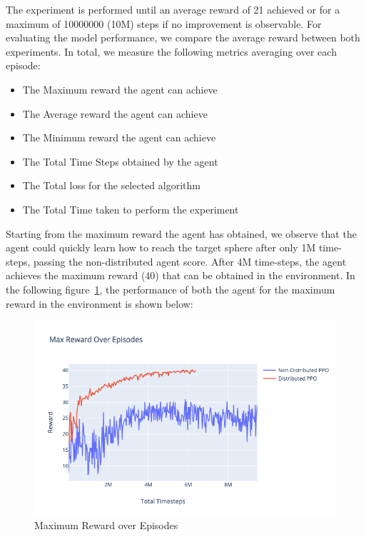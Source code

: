 The experiment is performed until an average reward of 21 achieved or for a maximum of 10000000 (10M) steps if no improvement is observable. For evaluating the model performance, we compare the average reward between both experiments. In total, we measure the following metrics averaging over each episode:
\begin{itemize}
		\item The Maximum reward the agent can achieve
		\item The Average reward the agent can achieve
		\item The Minimum reward the agent can achieve
		\item The Total Time Steps obtained by the agent
		\item The Total loss for the selected algorithm
		\item The Total Time taken to perform the experiment
\end{itemize}

Starting from the maximum reward the agent has obtained, we observe that the agent could quickly learn how to reach the target sphere after only 1M time-steps, passing the non-distributed agent score. After 4M time-steps, the agent achieves the maximum reward (40) that can be obtained in the environment. In the following figure~\ref{fig:2nd_exp_max_eps_reward}, the performance of both the agent for the maximum reward in the environment is shown below:
\begin{figure}[!htb]
		\centering
		\includegraphics[width=\linewidth]{figures/exps/2nd_exp/max_eps_reward.png}
		\caption{Maximum Reward over Episodes}
		\label{fig:2nd_exp_max_eps_reward}
\end{figure}

